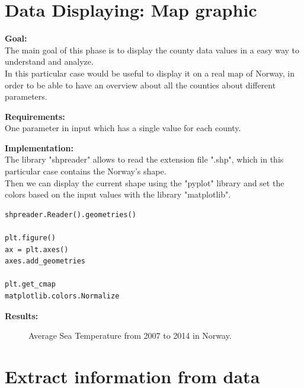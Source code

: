 \newpage

\section{Data Displaying: Map graphic}
\textbf{Goal:}\\
The main goal of this phase is to display the county data values in a easy way to understand and analyze.\\
In this particular case would be useful to display it on a real map of Norway, in order to be able to have an overview about all the counties about different parameters.

\textbf{Requirements:}\\
One parameter in input which has a single value for each county.

\textbf{Implementation:}\\
The library "shpreader" allows to read the extension file ".shp", which in this particular case contains the Norway's shape.\\
Then we can display the current shape using the "pyplot" library and set the colors based on the input values with the library "matplotlib".\\

\begin{lstlisting}
shpreader.Reader().geometries()

plt.figure()
ax = plt.axes()
axes.add_geometries

plt.get_cmap
matplotlib.colors.Normalize
\end{lstlisting}


\textbf{Results:} \\

\begin{figure}[H]
    \caption{Average Sea Temperature from 2007 to 2014 in Norway.}
\end{figure}

\newpage

\section{Extract information from data}
